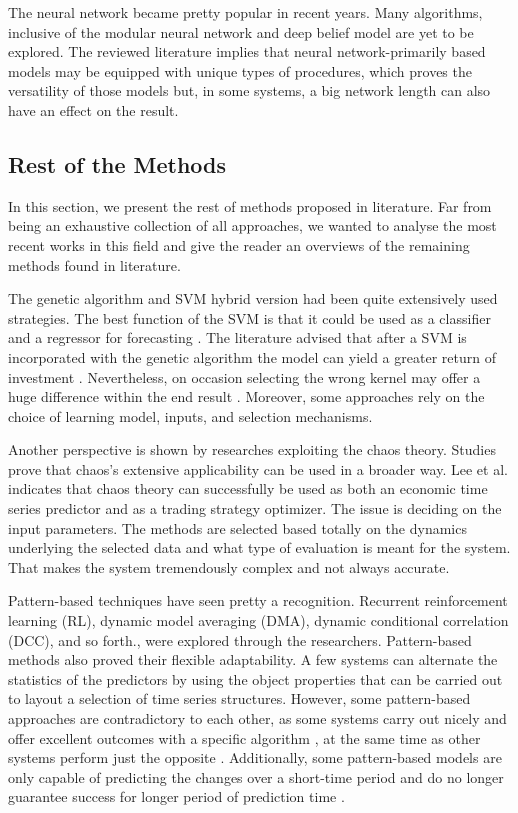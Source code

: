 The neural network became pretty popular in recent years. Many algorithms, inclusive of the modular neural network and deep belief model are yet to be explored. The reviewed literature implies that neural network-primarily based models may be equipped with unique types of procedures, which proves the versatility of those models but, in some systems, a big network length can also have an effect on the result.

\subsection{Rest of the Methods}
In this section, we present the rest of methods proposed in literature. Far from being an exhaustive collection of all approaches, we wanted to analyse the most recent works in this field and give the reader an overviews of the remaining methods found in literature.

The genetic algorithm and SVM hybrid version had been quite extensively used strategies. The best function of the SVM is that it could be used as a classifier \cite{58} and a regressor for forecasting \cite{59}. The literature advised that after a SVM is incorporated with the genetic algorithm the model can yield a greater return of investment \cite{58}. Nevertheless, on occasion selecting the wrong kernel may offer a huge difference within the end result \cite{59}. Moreover, some approaches rely on the choice of learning model, inputs, and selection mechanisms.

Another perspective is shown by researches exploiting the chaos theory. Studies prove that chaos's extensive applicability can be used in a broader way. Lee et al. \cite{Lee19} indicates that chaos theory can successfully be used as both an economic time series predictor and as a trading strategy optimizer. The issue is deciding on the input parameters. The methods are selected based totally on the dynamics underlying the selected data and what type of evaluation is meant for the system. That makes the system tremendously complex and not always accurate.

Pattern-based techniques have seen pretty a recognition. Recurrent reinforcement learning (RL), dynamic model averaging (DMA), dynamic conditional correlation (DCC), and so forth., were explored through the researchers. Pattern-based methods also proved their flexible adaptability. A few systems can alternate the statistics of the predictors by using the object properties \cite{BARTOS201757} that can be carried out to layout a selection of time series structures. However, some pattern-based approaches are contradictory to each other, as some systems carry out nicely and offer excellent outcomes with a specific algorithm \cite{8376549}, at the same time as other systems perform just the opposite \cite{CONTRERAS20181}. Additionally, some pattern-based models are only capable of predicting the changes over a short-time period and do no longer guarantee success for longer period of prediction time \cite{WILINSKI2019163}.

